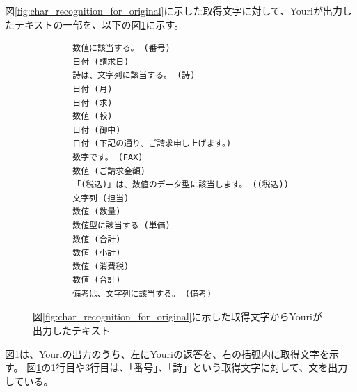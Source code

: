 図\ref{fig:char_recognition_for_original}に示した取得文字に対して、Youriが出力したテキストの一部を、以下の図\ref{fig:output_Youri}に示す。
\lstset{language=}
\begin{figure}[tp]
    \begin{lstlisting}
        数値に該当する。 (番号)
        日付 (請求日)
        詩は、文字列に該当する。 (詩)
        日付 (月)
        日付 (求)
        数値 (較)
        日付 (御中)
        日付 (下記の通り、ご請求申し上げます。)
        数字です。 (FAX)
        数値 (ご請求金額)
        「(税込)」は、数値のデータ型に該当します。 ((税込))
        文字列 (担当)
        数値 (数量)
        数値型に該当する (単価)
        数値 (合計)
        数値 (小計)
        数値 (消費税)
        数値 (合計)
        備考は、文字列に該当する。 (備考)
    \end{lstlisting}
    \caption{図\ref{fig:char_recognition_for_original}に示した取得文字からYouriが出力したテキスト}
    \label{fig:output_Youri}
\end{figure}
図\ref{fig:output_Youri}は、Youriの出力のうち、左にYouriの返答を、右の括弧内に取得文字を示す。
図\ref{fig:output_Youri}の1行目や3行目は、「番号」、「詩」という取得文字に対して、文を出力している。

